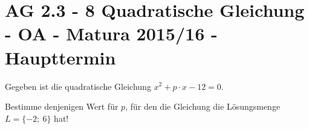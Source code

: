 \section{AG 2.3 - 8 Quadratische Gleichung - OA - Matura 2015/16 - Haupttermin}

\begin{beispiel}[AG 2.3]{1} %
Gegeben ist die quadratische Gleichung $x^2+p\cdot x - 12  =0$. \leer

Bestimme denjenigen Wert für $p$, für den die Gleichung die Lösungsmenge \mbox{$L =\{-2;~6\}$} hat!


\end{beispiel}